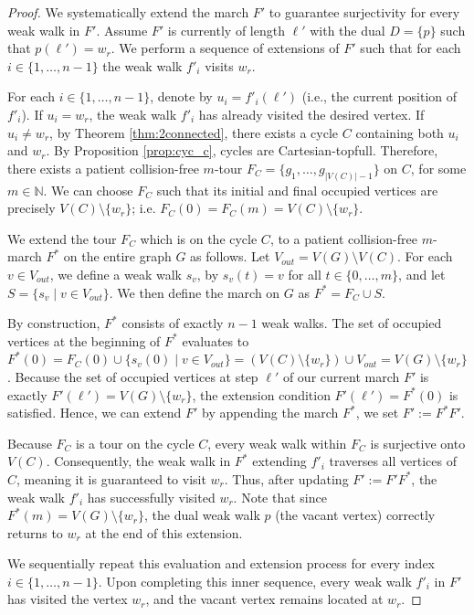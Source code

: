 \documentclass{article}
\begin{document}
\begin{proof}
We systematically extend the march $F'$ to guarantee surjectivity for every weak walk in $F'$. Assume $F'$ is currently of length $\ell'$ with the dual $D=\{p\}$ such that $p(\ell')=w_r$. We perform a sequence of extensions of $F'$ such that for each $i \in \{1, \ldots, n-1\}$ the weak walk $f'_i$ visits $w_r$. 

For each $i \in \{1, \ldots, n-1\}$, denote by $u_i = f'_i(\ell')$ (i.e., the current position of $f'_i$). If $u_i = w_r$, the weak walk $f'_i$ has already visited the desired vertex. If $u_i \neq w_r$, by Theorem \ref{thm:2connected}, there exists a cycle $C$ containing both $u_i$ and $w_r$. By Proposition \ref{prop:cyc_c}, cycles are Cartesian-topfull. Therefore, there exists a patient collision-free $m$-tour $F_C=\{g_1,\ldots, g_{|V(C)|-1}\}$ on $C$, for some $m \in \mathbb{N}$. We can choose $F_C$ such that its initial and final occupied vertices are precisely $V(C) \setminus \{w_r\}$; i.e. $F_C(0) = F_C(m) = V(C) \setminus \{w_r\}$.

We extend the tour $F_C$ which is on the cycle $C$, to a patient collision-free $m$-march $F^*$ on the entire graph $G$ as follows. Let $V_{out} = V(G) \setminus V(C)$. For each $v \in V_{out}$, we define a weak walk $s_v$, by $s_v(t) = v$ for all $t \in \{0, \ldots, m\}$, and let $S = \{s_v \mid v \in V_{out}\}$. We then define the march on $G$ as $F^* = F_C \cup S$. 
    
By construction, $F^*$ consists of exactly $n-1$ weak walks. The set of occupied vertices at the beginning of $F^*$ evaluates to $F^*(0) = F_C(0) \cup \{s_v(0) \mid v \in V_{out}\} = (V(C) \setminus \{w_r\}) \cup V_{out} = V(G) \setminus \{w_r\}$. Because the set of occupied vertices at step $\ell'$ of our current march $F'$ is exactly $F'(\ell') = V(G) \setminus \{w_r\}$, the extension condition $F'(\ell') = F^*(0)$ is satisfied. Hence, we can extend $F'$ by appending the march $F^*$, we set $F':=F^* F'$.

Because $F_C$ is a tour on the cycle $C$, every weak walk within $F_C$ is surjective onto $V(C)$. Consequently, the weak walk in $F^*$ extending $f'_i$ traverses all vertices of $C$, meaning it is guaranteed to visit $w_r$. Thus, after updating $F' := F' F^*$, the weak walk $f'_i$ has successfully visited $w_r$. Note that since $F^*(m) = V(G) \setminus \{w_r\}$, the dual weak walk $p$ (the vacant vertex) correctly returns to $w_r$ at the end of this extension.

We sequentially repeat this evaluation and extension process for every index $i \in \{1, \ldots, n-1\}$. Upon completing this inner sequence, every weak walk $f'_i$ in $F'$ has visited the vertex $w_r$, and the vacant vertex remains located at $w_r$.


\end{proof}
\end{document}
